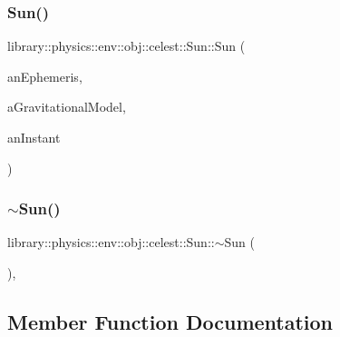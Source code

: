 \subsubsection{\texorpdfstring{Sun()}{Sun()}}
{\footnotesize\ttfamily library\+::physics\+::env\+::obj\+::celest\+::\+Sun\+::\+Sun (\begin{DoxyParamCaption}\item[{const Shared$<$ \hyperlink{classlibrary_1_1physics_1_1env_1_1_ephemeris}{Ephemeris} $>$ \&}]{an\+Ephemeris,  }\item[{const Shared$<$ \hyperlink{namespacelibrary_1_1physics_1_1env_1_1obj_1_1celest_ac63145c8cbe868bd79be8f6f423c8cf4}{Gravitational\+Model} $>$ \&}]{a\+Gravitational\+Model,  }\item[{const \hyperlink{classlibrary_1_1physics_1_1time_1_1_instant}{Instant} \&}]{an\+Instant }\end{DoxyParamCaption})}

\mbox{\label{classlibrary_1_1physics_1_1env_1_1obj_1_1celest_1_1_sun_a34a14e47bbbc26292809dba9c8d1ece8}} 
\subsubsection{\texorpdfstring{$\sim$\+Sun()}{~Sun()}}
{\footnotesize\ttfamily library\+::physics\+::env\+::obj\+::celest\+::\+Sun\+::$\sim$\+Sun (\begin{DoxyParamCaption}{ }\end{DoxyParamCaption})\hspace{0.3cm}{\ttfamily [override]}, {\ttfamily [virtual]}}



\subsection{Member Function Documentation}
\mbox{\label{classlibrary_1_1physics_1_1env_1_1obj_1_1celest_1_1_sun_a79fa2d336dad399c3d933b0f5a2f9427}} 

